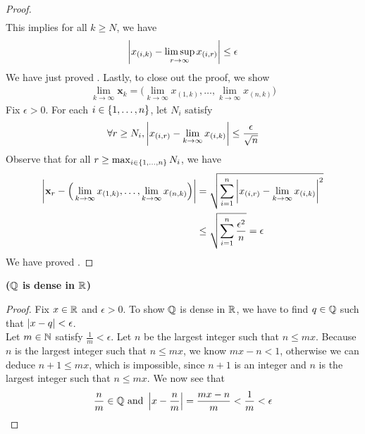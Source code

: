 \documentclass{report}
\begin{document}
\begin{proof}
\begin{align*}
\end{align*}
This implies for all $k\geq N$, we have 
\begin{align*}
\left|x_{(i,k)}-\limsup_{r\to\infty} x_{(i,r)}\right|\leq \epsilon 
\end{align*}
We have just proved . Lastly, to close out the proof, we show 
\begin{align}
\label{ran3}
\lim_{k\to \infty}\textbf{x}_k = \Big(\lim_{k\to \infty}x_{(1,k)},\dots ,\lim_{k\to \infty}x_{(n,k)}\Big)
\end{align}
Fix $\epsilon >0$. For each $i \in \{ 1,\dots ,n \}$, let $N_i$ satisfy 
 \begin{align*}
  \forall r\geq N_i ,\left|x_{(i,r)}- \lim_{k\to \infty}x_{(i,k)}\right|\leq  \frac{\epsilon }{\sqrt{n} }
\end{align*}
Observe that for all $r\geq \max_{i\in \{ 1,\dots,n \}} N_i$, we have 
\begin{align*}
\left|\textbf{x}_r - \Big(\lim_{k\to \infty}x_{(1,k)},\dots ,\lim_{k\to \infty}x_{(n,k)} \Big)\right|&=\sqrt{\sum_{i=1}^n \left|x_{(i,r)}- \lim_{k\to \infty}x_{(i,k)}\right|^2} \\
&\leq \sqrt{\sum_{i=1}^n \frac{\epsilon^2}{n}}=\epsilon 
\end{align*}
We have proved .











\end{proof}
\begin{theorem}
\textbf{($\mathbb{Q}$ is dense in $\mathbb{R}$)}
\end{theorem}
\begin{proof}
Fix $x\in\mathbb{R}$ and $\epsilon >0$. To show $\mathbb{Q}$ is dense in  $\mathbb{R}$, we have to find $q\in\mathbb{Q}$ such that $\left|x-q\right|<\epsilon $.\\

Let $m\in\mathbb{N}$ satisfy $\frac{1}{m}<\epsilon $. Let $n$ be the largest integer such that $n\leq mx$. Because $n$ is the largest integer such that $n\leq mx$, we know $mx-n<1$, otherwise we can deduce $n+1\leq mx$, which is impossible, since $n+1$ is an integer and $n$ is the largest integer such that $n\leq mx$. We now see that 
\begin{align*}
\frac{n}{m}\in\mathbb{Q} \text{ and }\left|x-\frac{n}{m}\right|=\frac{mx-n}{m}< \frac{1}{m}<\epsilon 
\end{align*}



\end{proof}
\end{document}
